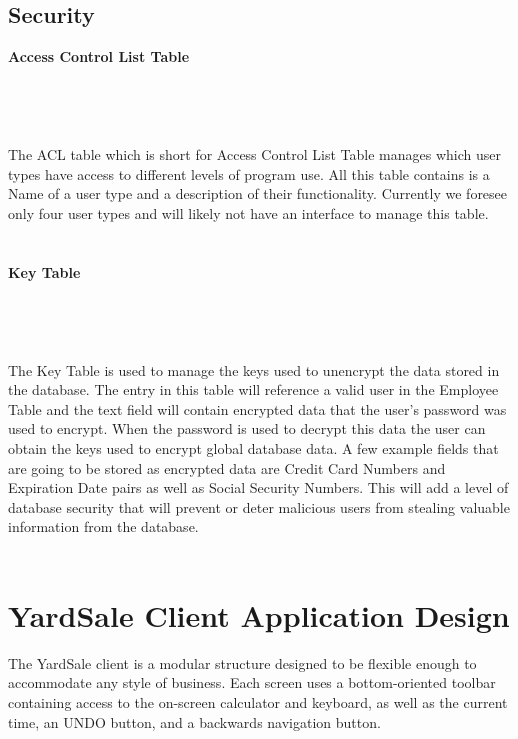 \documentclass{report}
\begin{document}
        \subsection{Security}

        {\bf Access Control List Table}\\
        \\
        \\
        \\
        \\
        The ACL table which is short for Access Control List Table manages which user types have access
        to different levels of program use. All this table contains is a Name of a user type and a description
        of their functionality. Currently we foresee only four user types and will likely not have an
        interface to manage this table.\\
        \\
        \\
        {\bf Key Table}\\
        \\
        \\
        \\
        \\
        The Key Table is used to manage the keys used to unencrypt the data stored in the database. The
        entry in this table will reference a valid user in the Employee Table and the text field will
        contain encrypted data that the user's password was used to encrypt. When the password is used
        to decrypt this data the user can obtain the keys used to encrypt global database data. A few
        example fields that are going to be stored as encrypted data are Credit Card Numbers and Expiration
        Date pairs as well as Social Security Numbers. This will add a level of database security that
        will prevent or deter malicious users from stealing valuable information from the database.\\
        \\

    \newpage

    \section{YardSale Client Application Design}
    The YardSale client is a modular structure designed to
    be flexible enough to accommodate any style of business.
    Each screen uses a bottom-oriented toolbar containing access
    to the on-screen calculator and keyboard, as well as the
    current time, an UNDO button, and a backwards navigation
    button.\\
\end{document}
